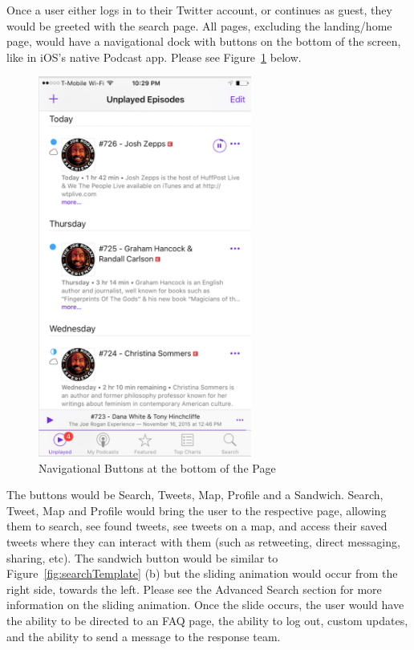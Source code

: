 \documentclass[11pt]{article}
\begin{document}
Once a user either logs in to their Twitter account, or continues as guest, they would be greeted with the search page. All pages, excluding the landing/home page, would have a navigational dock with buttons on the bottom of the screen, like in iOS's native Podcast app. Please see Figure~\ref{fig:navButtons} below.

\begin{figure}[H]
    \centering
    \includegraphics[width=7cm]{navButton}
    \caption{Navigational Buttons at the bottom of the Page}
    \label{fig:navButtons}                
\end{figure}

The buttons would be Search, Tweets, Map, Profile and a Sandwich. Search, Tweet, Map and Profile would bring the user to the respective page, allowing them to search, see found tweets, see tweets on a map, and access their saved tweets where they can interact with them (such as retweeting, direct messaging, sharing, etc). The sandwich button would be similar to Figure~\ref{fig:searchTemplate} (b) but the sliding animation would occur from the right side, towards the left. Please see the Advanced Search section for more information on the sliding animation. Once the slide occurs, the user would have the ability to be directed to an FAQ page, the ability to log out, custom updates, and the ability to send a message to the response team.
\end{document}
